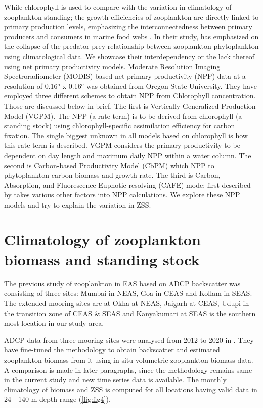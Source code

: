 \documentclass{article}
\begin{document}
	While chlorophyll is used to compare with the variation in climatology of zooplankton standing; the growth efficiencies of zooplankton are directly linked to primary production levels, emphasizing the interconnectedness between primary producers and consumers in marine food webs \citep{Friedland.2012}. In their study, \citep{aparna2022seasonal} has emphasized on the collapse of the predator-prey relationship between zooplankton-phytoplankton using climatological data. We showcase their interdependency or the lack thereof using net primary productivity models.
	Moderate Resolution Imaging Spectroradiometer (MODIS) based net primary productivity (NPP) data at a resolution of 0.16$^o$ x 0.16$^o$ was obtained from Oregon State University. They have employed three different schemes to obtain NPP from Chlorophyll concentration. Those are discussed below in brief. The first is Vertically Generalized Production Model (VGPM). The NPP (a rate term) is to be derived from chlorophyll (a standing stock) using chlorophyll-specific assimilation efficiency for carbon fixation. The single biggest unknown in all models based on chlorophyll is how this rate term is described. VGPM considers the primary productivity to be dependent on day length and maximum daily NPP within a water column. The second is Carbon-based Productivity Model (CbPM) which NPP to phytoplankton carbon biomass and growth rate. The third is Carbon, Absorption, and Fluorescence Euphotic-resolving (CAFE) mode; first described by \citep{silsbe2016cafe} takes various other factors into NPP calculations. We explore these NPP models and try to explain the variation in ZSS.
	 
	\section{Climatology of zooplankton biomass and standing stock}
	The previous study of zooplankton in EAS based on ADCP backscatter was consisting of three sites: Mumbai in NEAS, Goa in CEAS and Kollam in SEAS. The extended mooring sites are at Okha at NEAS, Jaigarh at CEAS, Udupi in the transition zone of CEAS \& SEAS and Kanyakumari at SEAS is the southern most location in our study area. 

	ADCP data from three mooring sites were analysed from 2012 to 2020 in \citep{aparna2022seasonal}. They have fine-tuned the methodology to obtain backscatter and estimated zooplankton biomass from it using in situ volumetric zooplankton biomass data. A comparison is made in later paragraphs, since the methodology remains same in the current study and new time series data is available. The monthly climatology of biomass and ZSS is computed for all locations having valid data in 24 - 140 m depth range (\cref{fig:fig4}).
	 
\end{document}
